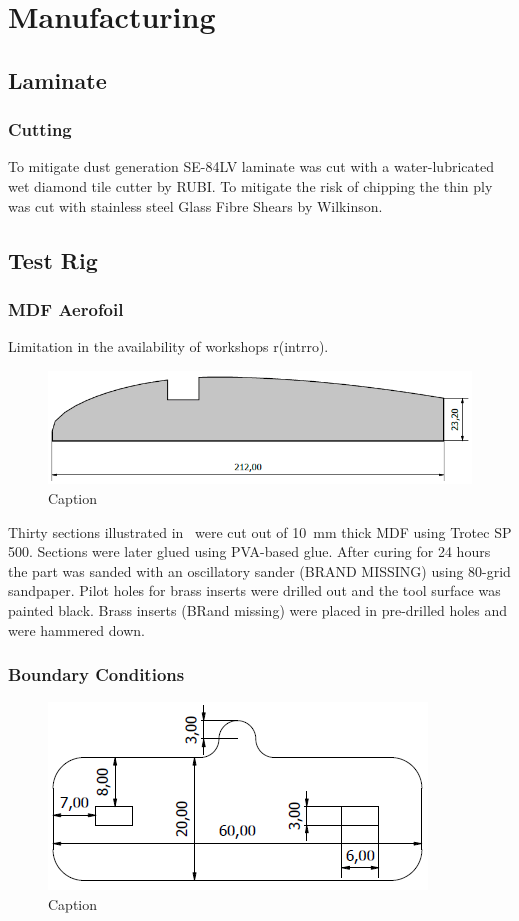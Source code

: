 \documentclass{IEEEtran}
\begin{document}
		
	\section{Manufacturing}
    \subsection{Laminate}
    \subsubsection{Cutting}
    To mitigate dust generation SE-84LV laminate was cut with a water-lubricated wet diamond tile cutter by RUBI. To mitigate the risk of chipping the thin ply was cut with stainless steel Glass Fibre Shears by Wilkinson.
    \subsection{Test Rig}
    \subsubsection{MDF Aerofoil}
    Limitation in the availability of workshops r(intrro). 
    \begin{figure}[h]
        \centering
        \includegraphics[width = 0.5\linewidth]{Figures/Jan/laser2.png}
        \caption{Caption}
        \label{fig:laser}
    \end{figure}
    Thirty sections illustrated in~ were cut out of \SI{10}{\milli \meter} thick MDF using Trotec SP 500. Sections were later glued using PVA-based glue. After curing for 24 hours the part  was sanded with an oscillatory sander (BRAND MISSING) using 80-grid sandpaper. Pilot holes for brass inserts were drilled out and the tool surface was painted black. Brass inserts (BRand missing) were placed in pre-drilled holes and were hammered down.
    \subsubsection{Boundary Conditions}
    \begin{figure}[h!]
        \centering
        \includegraphics[width = \linewidth]{Figures/Jan/nippleNumber.PNG}
        \caption{Caption}
        \label{fig:nipple}
    \end{figure}
\end{document}
